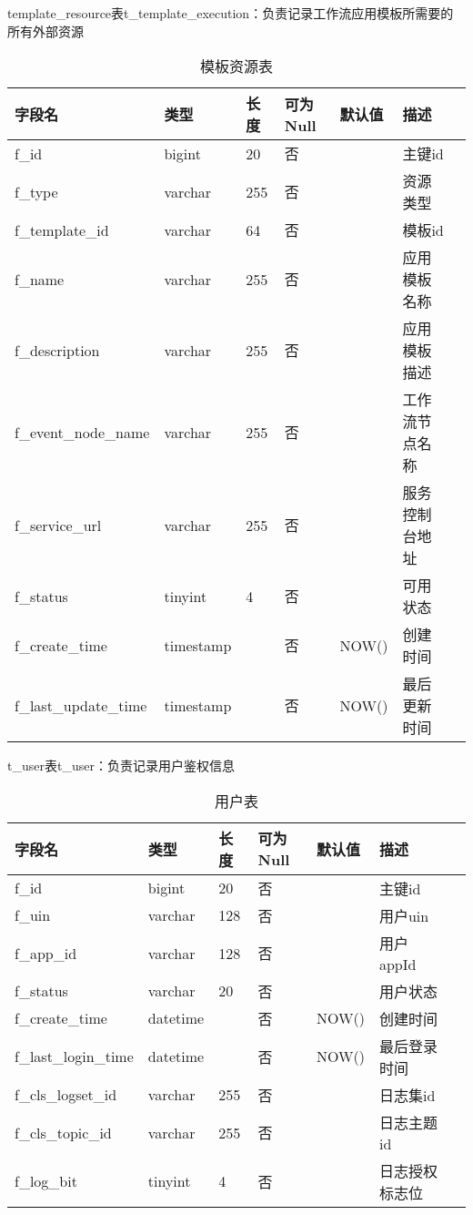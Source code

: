 template\_resource表t\_template\_execution：负责记录工作流应用模板所需要的所有外部资源
\begin{table}[H]
    \centering
    \caption{模板资源表}
    \label{tab:t_template_resource}
    \begin{tabular}{lllllll}
        \toprule
        字段名	&类型	&长度	&可为Null&默认值	&描述 \\
        \midrule
        f\_id	&bigint	&20 &否 && 主键id\\
        f\_type	&varchar	&255 &否 && 资源类型\\
        f\_template\_id	&varchar	&64 &否 && 模板id\\
        f\_name	&varchar	&255 &否 && 应用模板名称\\
        f\_description	&varchar	&255 &否 && 应用模板描述\\
        f\_event\_node\_name	&varchar	&255 &否 && 工作流节点名称\\
        f\_service\_url	&varchar	&255 &否 && 服务控制台地址\\
        f\_status	&tinyint	&4 &否 && 可用状态\\
        f\_create\_time	&timestamp	& &否 &NOW() & 创建时间\\
        f\_last\_update\_time	&timestamp	& &否 &NOW() & 最后更新时间\\
        \bottomrule
    \end{tabular}
\end{table}

t\_user表t\_user：负责记录用户鉴权信息
\begin{table}[H]
    \centering
    \caption{用户表}
    \label{tab:t_user}
    \begin{tabular}{lllllll}
        \toprule
        字段名	&类型	&长度	&可为Null &默认值	&描述 \\
        \midrule
        f\_id	&bigint	&20 &否 && 主键id\\
        f\_uin	&varchar	&128 &否 && 用户uin\\
        f\_app\_id	&varchar	&128 &否 && 用户appId\\
        f\_status	&varchar	&20 &否 && 用户状态\\
        f\_create\_time	&datetime	& &否 &NOW()  & 创建时间\\
        f\_last\_login\_time	&datetime	& &否 &NOW()  & 最后登录时间\\
        f\_cls\_logset\_id	&varchar	&255 &否 && 日志集id\\
        f\_cls\_topic\_id	&varchar	&255 &否 && 日志主题id\\
        f\_log\_bit	&tinyint	&4 &否 && 日志授权标志位\\
        \bottomrule
    \end{tabular}
\end{table}
